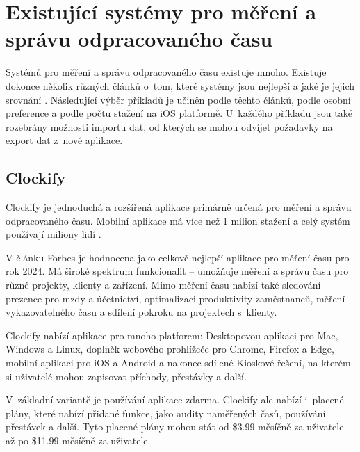 \section{Existující systémy pro měření a správu odpracovaného času}\label{existing-tracking-solutions}

Systémů pro měření a správu odpracovaného času existuje mnoho. Existuje dokonce několik různých článků o~tom, které systémy jsou nejlepší a jaké je jejich srovnání \cite{forbes-tracking-apps-article} \cite{zapier-tracking-apps-article}. Následující výběr příkladů je učiněn podle těchto článků, podle osobní preference a podle počtu stažení na iOS platformě. U~každého příkladu jsou také rozebrány možnosti importu dat, od kterých se mohou odvíjet požadavky na export dat z~nové aplikace.

\subsection{Clockify}

Clockify je jednoduchá a rozšířená aplikace primárně určená pro měření a správu odpracovaného času. Mobilní aplikace má více než 1 milion stažení \cite{clockify-app-magic} a celý systém používají miliony lidí \cite{clockify-customers}. 

V článku Forbes je hodnocena jako celkově nejlepší aplikace pro měření času pro rok 2024. Má široké spektrum funkcionalit – umožňuje měření a správu času pro různé projekty, klienty a zařízení. Mimo měření času nabízí také sledování prezence pro mzdy a účetnictví, optimalizaci produktivity zaměstnanců, měření vykazovatelného času a sdílení pokroku na projektech s~klienty. \cite{forbes-tracking-apps-article}

Clockify nabízí aplikace pro mnoho platforem: Desktopovou aplikaci pro Mac, Windows a Linux, doplněk webového prohlížeče pro Chrome, Firefox a Edge, mobilní aplikaci pro iOS a Android a nakonec sdílené Kioskové řešení, na kterém si uživatelé mohou zapisovat příchody, přestávky a další. \cite{clockify-apps}

V~základní variantě je používání aplikace zdarma. Clockify ale nabízí i~placené plány, které nabízí přidané funkce, jako audity naměřených časů, používání přestávek a další. Tyto placené plány mohou stát od \$3.99 měsíčně za uživatele až po \$11.99 měsíčně za uživatele. \cite{clockify-pricing} 

